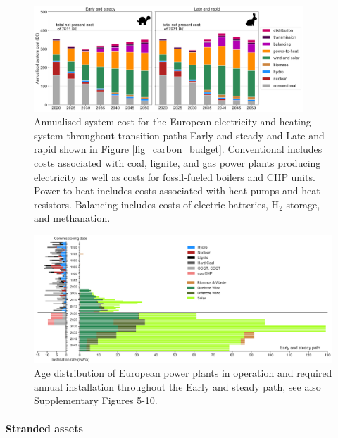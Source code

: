 \documentclass[5p]{elsarticle} %
\begin{document}
\begin{figure}[!h]
\centering
\includegraphics[width=0.9\textwidth]{../figures/System_cost_Base.png}
\caption{Annualised system cost for the European electricity and heating system throughout transition paths Early and steady and Late and rapid shown in Figure \ref{fig_carbon_budget}. Conventional includes costs associated with coal, lignite, and gas power plants producing electricity as well as costs for fossil-fueled boilers and CHP units. Power-to-heat includes costs associated with heat pumps and heat resistors. Balancing includes costs of electric batteries, H$_2$ storage, and methanation. } \label{fig_system_cost} 
\end{figure}

\begin{figure}[!h]
\centering
\includegraphics[width=\textwidth]{../figures/age_distribution_Base_Gentle.png}
\caption{Age distribution of European power plants in operation \cite{powerplantmatching, IRENA_2019} and required annual installation throughout the Early and steady path, see also Supplementary Figures 5-10.} \label{fig_age_distribution} 
\end{figure}

\paragraph{\textbf{Stranded assets}} \
\end{document}
